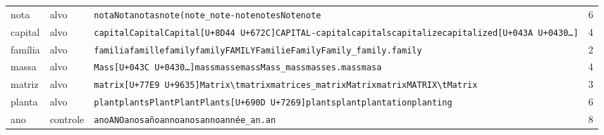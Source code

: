 \begin{tabularx}{\linewidth}{llXr}
nota & alvo & \texttt{nota}\enspace \texttt{Nota}\enspace \texttt{\textvisiblespace{}notas}\enspace \texttt{\textvisiblespace{}note}\enspace \texttt{(note}\enspace \texttt{\_note}\enspace \texttt{-{}note}\enspace \texttt{\textvisiblespace{}notes}\enspace \texttt{\textvisiblespace{}Note}\enspace \texttt{note} & 6 \\
capital & alvo & \texttt{capital}\enspace \texttt{\textvisiblespace{}Capital}\enspace \texttt{Capital}\enspace \texttt{[U+8D44 U+672C]}\enspace \texttt{\textvisiblespace{}CAPITAL}\enspace \texttt{-{}capital}\enspace \texttt{\textvisiblespace{}capitals}\enspace \texttt{\textvisiblespace{}capitalize}\enspace \texttt{\textvisiblespace{}capitalized}\enspace \texttt{\textvisiblespace{}[U+043A U+0430\ldots{}]} & 4 \\
família & alvo & \texttt{\textvisiblespace{}familia}\enspace \texttt{\textvisiblespace{}famille}\enspace \texttt{\textvisiblespace{}family}\enspace \texttt{family}\enspace \texttt{\textvisiblespace{}FAMILY}\enspace \texttt{\textvisiblespace{}Familie}\enspace \texttt{Family}\enspace \texttt{\textvisiblespace{}Family}\enspace \texttt{\_family}\enspace \texttt{.family} & 2 \\
massa & alvo & \texttt{\textvisiblespace{}Mass}\enspace \texttt{\textvisiblespace{}[U+043C U+0430\ldots{}]}\enspace \texttt{\textvisiblespace{}mass}\enspace \texttt{\textvisiblespace{}masse}\enspace \texttt{mass}\enspace \texttt{Mass}\enspace \texttt{\_mass}\enspace \texttt{\textvisiblespace{}masses}\enspace \texttt{.mass}\enspace \texttt{\textvisiblespace{}masa} & 4 \\
matriz & alvo & \texttt{\textvisiblespace{}matrix}\enspace \texttt{[U+77E9 U+9635]}\enspace \texttt{\textvisiblespace{}Matrix}\enspace \texttt{\textbackslash{}tmatrix}\enspace \texttt{\textvisiblespace{}matrices}\enspace \texttt{\_matrix}\enspace \texttt{Matrix}\enspace \texttt{matrix}\enspace \texttt{\textvisiblespace{}MATRIX}\enspace \texttt{\textbackslash{}tMatrix} & 3 \\
planta & alvo & \texttt{\textvisiblespace{}plant}\enspace \texttt{\textvisiblespace{}plants}\enspace \texttt{\textvisiblespace{}Plant}\enspace \texttt{Plant}\enspace \texttt{\textvisiblespace{}Plants}\enspace \texttt{[U+690D U+7269]}\enspace \texttt{plants}\enspace \texttt{plant}\enspace \texttt{\textvisiblespace{}plantation}\enspace \texttt{\textvisiblespace{}planting} & 6 \\
\midrule
ano & controle & \texttt{ano}\enspace \texttt{ANO}\enspace \texttt{\textvisiblespace{}anos}\enspace \texttt{\textvisiblespace{}año}\enspace \texttt{\textvisiblespace{}anno}\enspace \texttt{anos}\enspace \texttt{anno}\enspace \texttt{\textvisiblespace{}année}\enspace \texttt{\_an}\enspace \texttt{.an} & 8 \\

\end{tabularx}
